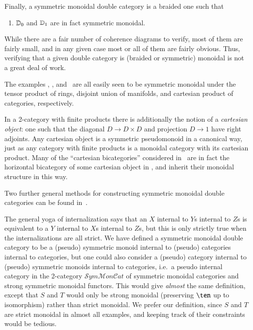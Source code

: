 Finally, a symmetric monoidal double category is a braided one such that
\begin{enumerate}\setcounter{enumi}{\value{mondbl}}
\item $\mathbb{D}_0$ and $\mathbb{D}_1$ are in fact symmetric monoidal.
\end{enumerate}
While there are a fair number of coherence diagrams to verify, most of
them are fairly small, and in any given case most or all of them are
fairly obvious.  Thus, verifying that a given double category is
(braided or symmetric) monoidal is not a great deal of work.

\begin{eg}
  The examples \lMod, \lnCob, and \lProf\ are all easily seen to be
  symmetric monoidal under the tensor product of rings, disjoint union
  of manifolds, and cartesian product of categories, respectively.
\end{eg}

\begin{rmk}
  In a 2-category with finite products there is additionally the
  notion of a \emph{cartesian object}: one such that the diagonal
  $D\to D\times D$ and projection $D\to 1$ have right adjoints.  Any
  cartesian object is a symmetric pseudomonoid in a canonical way,
  just as any category with finite products is a monoidal category
  with its cartesian product.  Many of the ``cartesian bicategories''
  considered in~\cite{cw:cart-bicats-i,ckww:cartbicats-ii} are in
  fact the horizontal bicategory of some cartesian object in \cDbl,
  and inherit their monoidal structure in this way.
\end{rmk}

Two further general methods for constructing symmetric monoidal double
categories can be found in~\cite{shulman:frbi}.

\begin{rmk}
  The general yoga of internalization says that an $X$ internal to
  $Y$s internal to $Z$s is equivalent to a $Y$ internal to $X$s
  internal to $Z$s, but this is only strictly true when the
  internalizations are all strict.  We have defined a symmetric
  monoidal double category to be a (pseudo) symmetric monoid internal
  to (pseudo) categories internal to categories, but one could also
  consider a (pseudo) category internal to (pseudo) symmetric monoids
  internal to categories, i.e.\ a pseudo internal category in the
  2-category
  $\mathcal{S}\mathit{ym}\mathcal{M}\mathit{on}\mathcal{C}\mathit{at}$
  of symmetric monoidal categories and strong symmetric monoidal
  functors.  This would give \emph{almost} the same definition, except
  that $S$ and $T$ would only be strong monoidal (preserving $\ten$ up
  to isomorphism) rather than strict monoidal.  We prefer our
  definition, since $S$ and $T$ are strict monoidal in almost all
  examples, and keeping track of their constraints would be tedious.
\end{rmk}

